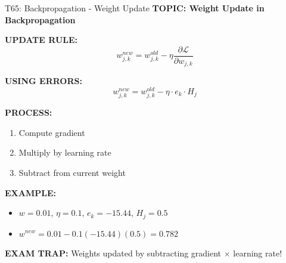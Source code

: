 \documentclass[8pt]{beamer}
\begin{document}
	\begin{frame}{T65: Backpropagation - Weight Update}
		\fontsize{6.5}{7.5}\selectfont
		\textbf{TOPIC: Weight Update in Backpropagation}
		
		\vspace{0.1cm}
		\textbf{UPDATE RULE:}
		\[
		w_{j,k}^{new} = w_{j,k}^{old} - \eta \frac{\partial \mathcal{L}}{\partial w_{j,k}}
		\]
		
		\vspace{0.1cm}
		\textbf{USING ERRORS:}
		\[
		w_{j,k}^{new} = w_{j,k}^{old} - \eta \cdot e_k \cdot H_j
		\]
		
		\vspace{0.1cm}
		\textbf{PROCESS:}
		\begin{enumerate}
			\item Compute gradient
			\item Multiply by learning rate
			\item Subtract from current weight
		\end{enumerate}
		
		\vspace{0.1cm}
		\textbf{EXAMPLE:}
		\begin{itemize}
			\item $w = 0.01$, $\eta = 0.1$, $e_k = -15.44$, $H_j = 0.5$
			\item $w^{new} = 0.01 - 0.1(-15.44)(0.5) = 0.782$
		\end{itemize}
		
		\textcolor{myred}{\textbf{EXAM TRAP:}} Weights updated by \textcolor{myblue}{subtracting} gradient $\times$ learning rate!
	\end{frame}
	
\end{document}
